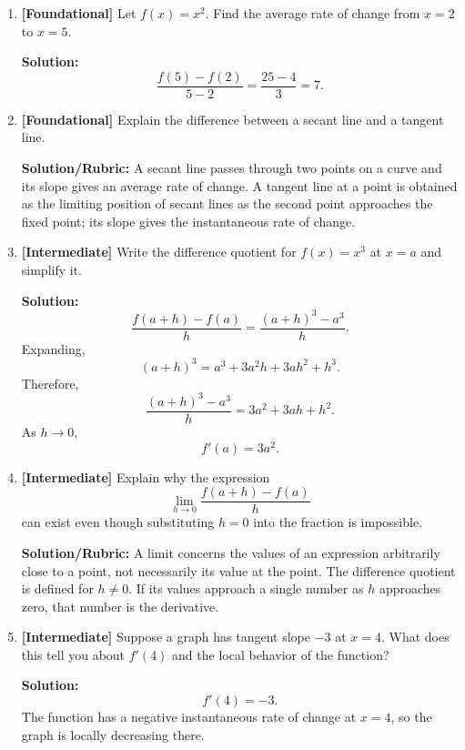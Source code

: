\documentclass{article}
\begin{document}
\begin{enumerate}[leftmargin=*]

    \item \textbf{[Foundational]} Let $f(x)=x^2$. Find the average rate of change from $x=2$ to $x=5$.

    \textbf{Solution:}
    \[
        \frac{f(5)-f(2)}{5-2}
        =
        \frac{25-4}{3}
        =
        7.
    \]

    \item \textbf{[Foundational]} Explain the difference between a secant line and a tangent line.

    \textbf{Solution/Rubric:}
    A secant line passes through two points on a curve and its slope gives an average rate of change. A tangent line at a point is obtained as the limiting position of secant lines as the second point approaches the fixed point; its slope gives the instantaneous rate of change.

    \item \textbf{[Intermediate]} Write the difference quotient for $f(x)=x^3$ at $x=a$ and simplify it.

    \textbf{Solution:}
    \[
        \frac{f(a+h)-f(a)}{h}
        =
        \frac{(a+h)^3-a^3}{h}.
    \]
    Expanding,
    \[
        (a+h)^3
        =
        a^3+3a^2h+3ah^2+h^3.
    \]
    Therefore,
    \[
        \frac{(a+h)^3-a^3}{h}
        =
        3a^2+3ah+h^2.
    \]
    As $h\to0$,
    \[
        f'(a)=3a^2.
    \]

    \item \textbf{[Intermediate]} Explain why the expression
    \[
        \lim_{h\to0}
        \frac{f(a+h)-f(a)}{h}
    \]
    can exist even though substituting $h=0$ into the fraction is impossible.

    \textbf{Solution/Rubric:}
    A limit concerns the values of an expression arbitrarily close to a point, not necessarily its value at the point. The difference quotient is defined for $h\neq0$. If its values approach a single number as $h$ approaches zero, that number is the derivative.

    \item \textbf{[Intermediate]} Suppose a graph has tangent slope $-3$ at $x=4$. What does this tell you about $f'(4)$ and the local behavior of the function?

    \textbf{Solution:}
    \[
        f'(4)=-3.
    \]
    The function has a negative instantaneous rate of change at $x=4$, so the graph is locally decreasing there.


\end{enumerate}
\end{document}
